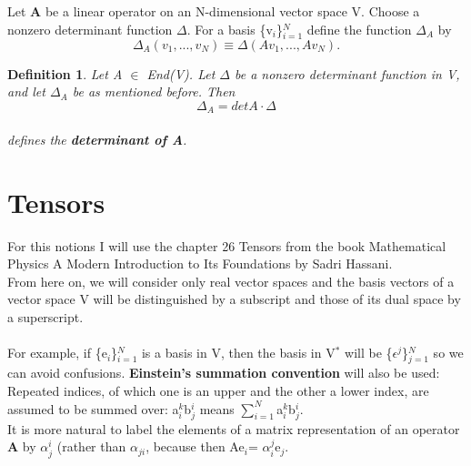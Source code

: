 \documentclass[12pt,a4paper]{article}
\newtheorem{defn}[thm]{Definition}
\begin{document}
Let \textbf{A} be a linear operator on an N-dimensional vector space V. Choose a nonzero determinant function $\Delta$. For a basis \{v$_i$\}$^{N}_{i=1}$ define the function $\Delta_A$ by \\ \begin{equation}
\Delta_A(v_1,...,v_N) \equiv \Delta(Av_1,...,Av_N).
\end{equation}
\begin{defn}
Let A $\in$ End(V). Let $\Delta$ be a nonzero determinant function in V, and let $\Delta_A$ be as mentioned before. Then \begin{equation}
\Delta_A = det A\cdot \Delta
\end{equation}
\\
defines the \textbf{determinant of A}.\end{defn}
\newpage
\section{Tensors}
For this notions I will use the chapter 26 Tensors from the book Mathematical Physics A Modern Introduction to Its Foundations by Sadri Hassani.\\
From here on, we will consider only real vector spaces and the basis vectors of a vector space V will be distinguished by a subscript and those of its dual space by a superscript.\\\\For example, if \{e$_i$\}$^N_{i=1}$ is a basis in V, then the basis in V$^*$ will be \{$\epsilon^j$\}$^N_{j=1}$ so we can avoid confusions.\textbf{ Einstein's summation convention} will also be used:\\
Repeated indices, of which one is an upper and the other a lower index, are assumed to be summed over: a$^k_i$b$^i_j$ means $\sum^N_{i=1}$a$^k_i$b$^i_j$.\\
It is more natural to label the elements of a matrix representation of an operator \textbf{A} by $\alpha^i_j$ (rather than $\alpha_{ji}$, because then Ae$_i$= $\alpha^j_i$e$_j$.
\end{document}
